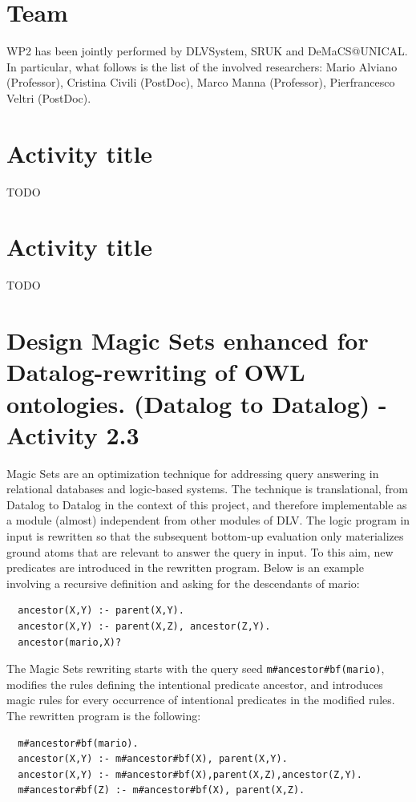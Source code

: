 \documentclass[oneside]{book}
\begin{document}
\section{Team}
WP2 has been jointly performed by DLVSystem, SRUK and DeMaCS@UNICAL. In particular, what follows is the list of the involved researchers: Mario Alviano (Professor), Cristina Civili (PostDoc), Marco Manna (Professor), Pierfrancesco Veltri (PostDoc).

\section{Activity title}
TODO
\section{Activity title}
TODO
\section{Design Magic Sets enhanced for Datalog-rewriting of OWL ontologies. (Datalog to Datalog) - Activity 2.3}
Magic Sets are an optimization technique for addressing query answering in relational databases and logic-based systems. The technique is translational, from Datalog to Datalog in the context of this project, and therefore implementable as a module (almost) independent from other modules of DLV. The logic program in input is rewritten so that the subsequent bottom-up evaluation only materializes ground atoms that are relevant to answer the query in input. To this aim, new predicates are introduced in the rewritten program. Below is an example involving a recursive definition and asking for the descendants of mario:
\begin{verbatim}
  ancestor(X,Y) :- parent(X,Y).
  ancestor(X,Y) :- parent(X,Z), ancestor(Z,Y).
  ancestor(mario,X)?
\end{verbatim}

The Magic Sets rewriting starts with the query seed {\tt m\#ancestor\#bf(mario)}, modifies the rules defining the intentional predicate ancestor, and introduces magic rules for every occurrence of intentional predicates in the modified rules. The rewritten program is the following:
\begin{verbatim}
  m#ancestor#bf(mario).
  ancestor(X,Y) :- m#ancestor#bf(X), parent(X,Y).
  ancestor(X,Y) :- m#ancestor#bf(X),parent(X,Z),ancestor(Z,Y).
  m#ancestor#bf(Z) :- m#ancestor#bf(X), parent(X,Z).
\end{verbatim}
\end{document}
